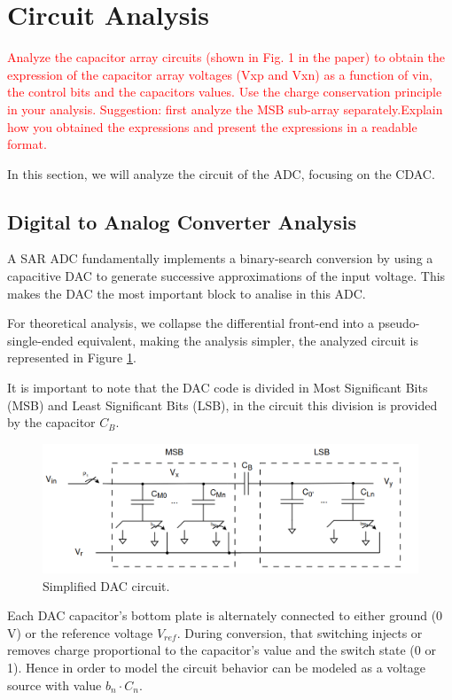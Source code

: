 \section{Circuit Analysis}
\label{sec:circuit_analysis}

\textcolor{red}{Analyze the capacitor array circuits (shown in Fig. 1 in the paper) to obtain the
expression of the capacitor array voltages (Vxp and Vxn) as a function of vin, the control bits and the capacitors values. Use the charge conservation principle in
your analysis. Suggestion: first analyze the MSB sub-array separately.Explain how you obtained the expressions and present the expressions in a readable format.}

In this section, we will analyze the circuit of the ADC, focusing on the CDAC.

\subsection{Digital to Analog Converter Analysis}

A SAR ADC fundamentally implements a binary-search conversion by using a capacitive DAC to generate successive approximations of the input voltage. This makes the DAC the most important block to analise in this ADC. 

For theoretical analysis, we collapse the differential front-end into a pseudo-single-ended equivalent, making the analysis simpler, the analyzed circuit is represented in Figure \ref{fig:DAC_Circ}. 

It is important to note that the DAC code is divided in Most Significant Bits (MSB) and Least Significant Bits (LSB), in the circuit this division is provided by the capacitor $C_B$.

\begin{figure}[H]
    \centering
    \includegraphics*[scale = 0.35]{Images/DacCirc.png}
    \caption{Simplified DAC circuit.}
    \label{fig:DAC_Circ}
\end{figure}

Each DAC capacitor's bottom plate is alternately connected to either ground (0 V) or the reference voltage $V_{ref}$. During conversion, that switching injects or removes charge proportional to the capacitor's value and the switch state (0 or 1). Hence in order to model the circuit behavior can be modeled as a voltage source with value $b_n\cdot C_n$. 


